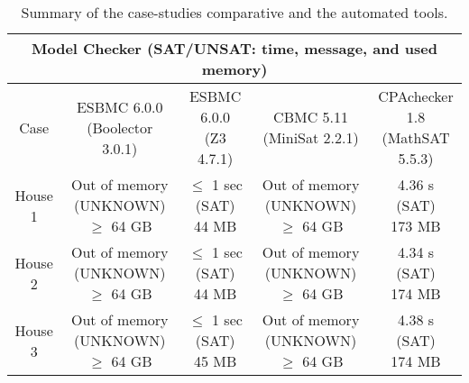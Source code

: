 %
\begin{table}
\centering
\caption{Summary of the case-studies comparative and the automated tools.}\label{cases}
\begin{scriptsize}
\begin{tabular}{c|c|c|c|c}
\hline
\hline
\multicolumn{5}{c}{Model Checker (SAT/UNSAT: time, message, and used memory)}\\
\hline
Case &  \makecell{ESBMC 6.0.0\\(Boolector 3.0.1)} & \makecell {ESBMC 6.0.0\\(Z3 4.7.1)} & \makecell{CBMC 5.11\\(MiniSat 2.2.1)} & \makecell{CPAchecker 1.8\\(MathSAT 5.5.3)}\\
\hline
\hline
House 1 &  \makecell{Out of memory \\(UNKNOWN)\\$\geq$ 64 GB} & \makecell{$\leq$ 1 sec \\(SAT) \\ 44 MB} & \makecell{Out of memory \\(UNKNOWN)\\$\geq$ 64 GB} & \makecell{4.36 s \\ (SAT) \\ 173 MB}\\
\hline
House 2 &  \makecell{Out of memory \\(UNKNOWN)\\$\geq$ 64 GB} & \makecell{$\leq$ 1 sec \\(SAT)\\ 44 MB} & \makecell{Out of memory \\(UNKNOWN)\\$\geq$ 64 GB} & \makecell{4.34 s \\ (SAT)\\174 MB}\\
\hline
House 3 &  \makecell{Out of memory \\(UNKNOWN)\\$\geq$ 64 GB} & \makecell{$\leq$ 1 sec \\(SAT)\\ 45 MB} & \makecell{Out of memory \\(UNKNOWN)\\$\geq$ 64 GB} & \makecell{4.38 s \\ (SAT)\\ 174 MB}\\

\end{tabular}
\end{scriptsize}
\end{table}
